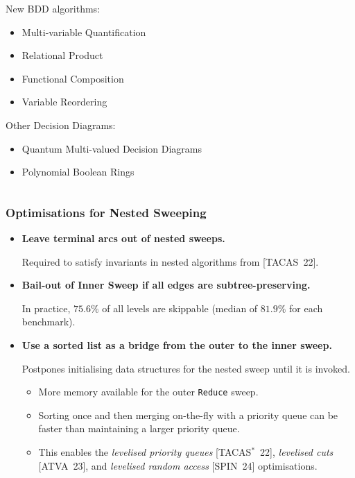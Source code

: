 \documentclass[english, aspectratio=169]{beamer}
\begin{document}
\begin{frame}
\begin{columns}
\begin{column}{0.58\linewidth}
      New BDD algorithms:
      \begin{itemize}
      \item[\faIcon{check-circle}] Multi-variable Quantification
      \item[\faIcon{check-circle}] Relational Product
      \item[\faIcon{circle}]       Functional Composition
      \item[\faIcon{circle}]       Variable Reordering
      \end{itemize}

      Other Decision Diagrams:
      \begin{itemize}
      \item[\faIcon{circle}]       Quantum Multi-valued Decision Diagrams
      \item[\faIcon{circle}]       Polynomial Boolean Rings
      \end{itemize}
    \end{column}
  \end{columns}
\end{frame}

\blankframe

\begin{frame}
  \frametitle{Optimisations for Nested Sweeping}

  \begin{itemize}
  \item {\bf Leave terminal arcs out of nested sweeps.}

    {\small Required to satisfy invariants in nested algorithms from [TACAS~22].}

  \item {\bf Bail-out of Inner Sweep if all edges are subtree-preserving.}

    {\small In practice, $75.6\%$ of all levels are skippable (median of $81.9\%$ for each
      benchmark).}

  \item {\bf Use a sorted list as a bridge from the outer to the inner sweep.}

    {\small Postpones initialising data structures for the nested sweep until it is invoked.}
    \begin{itemize}
    \item More memory available for the outer \texttt{Reduce} sweep.
    \item Sorting once and then merging on-the-fly with a priority queue can be faster than
      maintaining a larger priority queue.
    \item This enables the \emph{levelised priority queues} [TACAS$^*$~22], \emph{levelised cuts} [ATVA~23],
      and \emph{levelised random access} [SPIN~24] optimisations.
    \end{itemize}
  \end{itemize}
\end{frame}
\end{document}

